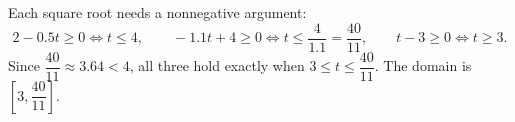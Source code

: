 Each square root needs a nonnegative argument:
\[
2-0.5t\ge0\iff t\le4,\qquad -1.1t+4\ge0\iff t\le\dfrac{4}{1.1}=\dfrac{40}{11},\qquad t-3\ge0\iff t\ge3 .
\]
Since $\dfrac{40}{11}\approx3.64<4$, all three hold exactly when $3\le t\le\dfrac{40}{11}$. The domain is $\boxed{\left[3,\dfrac{40}{11}\right]}$.
